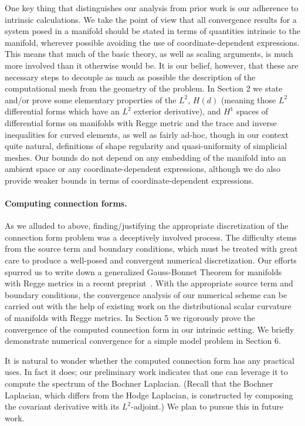 \documentclass[11pt]{article}
\begin{document}
One key thing that distinguishes our analysis from prior work is our adherence to intrinsic calculations. We take the point of view that all convergence results for a system posed in a manifold should be stated in terms of quantities intrinsic to the manifold, wherever possible avoiding the use of coordinate-dependent expressions. This means that much of the basic theory, as well as scaling arguments, is much more involved than it otherwise would be. It is our belief, however, that these are necessary steps to decouple as much as possible the description of the computational mesh from the geometry of the problem. In Section 2 we state and/or prove some elementary properties of the $L^2$, $H(d)$ (meaning those $L^2$ differential forms which have an $L^2$ exterior derivative), and $H^1$ spaces of differential forms on manifolds with Regge metric and the trace and inverse inequalities for curved elements, as well as fairly ad-hoc, though in our context quite natural, definitions of shape regularity and quasi-uniformity of simplicial meshes. Our bounds do not depend on any embedding of the manifold into an ambient space or any coordinate-dependent expressions, although we do also provide weaker bounds in terms of coordinate-dependent expressions.

\paragraph{Computing connection forms.}

As we alluded to above, finding/justifying the appropriate discretization of the connection form problem was a deceptively involved process. The difficulty stems from the source term and boundary conditions, which must be treated with great care to produce a well-posed and convergent numerical discretization. Our efforts spurred us to write down a generalized Gauss-Bonnet Theorem for manifolds with Regge metrics in a recent preprint~\cite{gawlik2025curvaturereggemetrics}.  With the appropriate source term and boundary conditions, the convergence analysis of our numerical scheme can be carried out with the help of existing work on the distributional scalar curvature of manifolds with Regge metrics. In Section 5 we rigorously prove the convergence of the computed connection form in our intrinsic setting. We briefly demonstrate numerical convergence for a simple model problem in Section 6.

It is natural to wonder whether the computed connection form has any practical uses.  In fact it does; our preliminary work indicates that one can leverage it to compute the spectrum of the Bochner Laplacian.  (Recall that the Bochner Laplacian, which differs from the Hodge Laplacian, is constructed by composing the covariant derivative with its $L^2$-adjoint.)  We plan to pursue this in future work.
\end{document}
